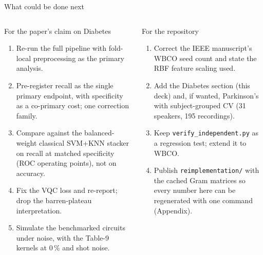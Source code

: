 \documentclass[aspectratio=169,10pt,t,xcolor={table}]{beamer}
\newcommand{\code}[1]{\texttt{\small #1}}
\begin{document}
\begin{frame}{What could be done next}
\begin{columns}[T]
\begin{block}{For the paper's claim on Diabetes}
\begin{enumerate}\footnotesize
  \item Re-run the full pipeline with fold-local preprocessing as the primary analysis.
  \item Pre-register recall as the single primary endpoint, with specificity as a co-primary cost; one correction family.
  \item Compare against the balanced-weight classical SVM+KNN stacker on recall at matched specificity (ROC operating points), not on accuracy.
  \item Fix the VQC loss and re-report; drop the barren-plateau interpretation.
  \item Simulate the benchmarked circuits under noise, with the Table-9 kernels at 0\,\% and shot noise.
\end{enumerate}
\end{block}
\begin{block}{For the repository}
\begin{enumerate}\footnotesize
  \item Correct the IEEE manuscript's WBCO seed count and state the RBF feature scaling used.
  \item Add the Diabetes section (this deck) and, if wanted, Parkinson's with subject-grouped CV (31 speakers, 195 recordings).
  \item Keep \code{verify\_independent.py} as a regression test; extend it to WBCO.
  \item Publish \code{reimplementation/} with the cached Gram matrices so every number here can be regenerated with one command (Appendix).
\end{enumerate}
\end{block}
\end{columns}
\end{frame}
\end{document}
